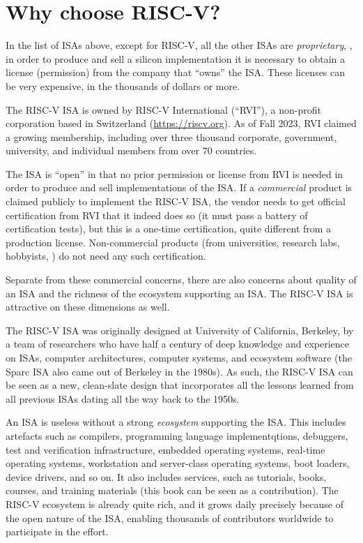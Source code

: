 
\section{Why choose RISC-V?}

In the list of ISAs above, except for RISC-V, all the other ISAs are
\emph{proprietary}, {\ie}, in order to produce and sell a silicon
implementation it is necessary to obtain a license (permission) from
the company that ``owns'' the ISA.  These licenses can be very
expensive, in the thousands of dollars or more.

The RISC-V ISA is owned by RISC-V International (``RVI''), a
non-profit corporation based in Switzerland (\url{https://riscv.org}).
As of Fall 2023, RVI claimed a growing membership, including over
three thousand corporate, government, university, and individual
members from over 70 countries.

The ISA is ``open'' in that no prior permission or license from RVI is
needed in order to produce and sell implementations of the ISA.  If a
\emph{commercial} product is claimed publicly to implement the RISC-V
ISA, the vendor needs to get official certification from RVI that it
indeed does so (it must pass a battery of certification tests), but
this is a one-time certification, quite different from a production
license.  Non-commercial products (from universities, research labs,
hobbyists, {\etc}) do not need any such certification.

Separate from these commercial concerns, there are also concerns about
quality of an ISA and the richness of the ecosystem supporting an ISA.
The RISC-V ISA is attractive on these dimensions as well.

The RISC-V ISA was originally designed at University of California,
Berkeley, by a team of researchers who have half a century of deep
knowledge and experience on ISAs, computer architectures, computer
systems, and ecosystem software (the Sparc ISA also came out of
Berkeley in the 1980s).  As such, the RISC-V ISA can be seen as a new,
clean-slate design that incorporates all the lessons learned from all
previous ISAs dating all the way back to the 1950s.

An ISA is useless without a strong \emph{ecosystem} supporting the
ISA.  This includes artefacts such as compilers, programming language
implementqtions, debuggers, test and verification infrastructure,
embedded operating systems, real-time operating systems, workstation
and server-class operating systems, boot loaders, device drivers, and
so on.  It also includes services, such as tutorials, books, courses,
and training materials (this book can be seen as a contribution).  The
RISC-V ecosystem is already quite rich, and it grows daily precisely
because of the open nature of the ISA, enabling thousands of
contributors worldwide to participate in the effort.

